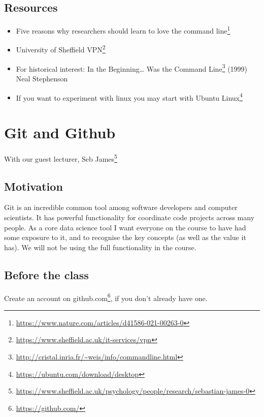 \documentclass[
  12pt,
  a5paper,
]{book}
\DeclareRobustCommand{\href}[2]{#2\footnote{\url{#1}}}
\providecommand{\tightlist}{%
  \setlength{\itemsep}{0pt}\setlength{\parskip}{0pt}}
\begin{document}
\hypertarget{resources-7}{%
\section{Resources}\label{resources-7}}

\begin{itemize}
\tightlist
\item
  \href{https://www.nature.com/articles/d41586-021-00263-0}{Five reasons why researchers should learn to love the command line}
\item
  \href{https://www.sheffield.ac.uk/it-services/vpn}{University of Sheffield VPN}
\item
  For historical interest: \href{http://cristal.inria.fr/~weis/info/commandline.html}{In the Beginning\ldots{} Was the Command Line} (1999) Neal Stephenson
\item
  If you want to experiment with linux you may start with \href{https://ubuntu.com/download/desktop}{Ubuntu Linux}
\end{itemize}

\hypertarget{git-and-github}{%
\chapter{Git and Github}\label{git-and-github}}

With our guest lecturer, \href{https://www.sheffield.ac.uk/psychology/people/research/sebastian-james-0}{Seb James}

\hypertarget{motivation-1}{%
\section{Motivation}\label{motivation-1}}

Git is an incredible common tool among software developers and computer scientists. It has powerful functionality for coordinate code projects across many people. As a core data science tool I want everyone on the course to have had some exposure to it, and to recognise the key concepts (as well as the value it has). We will not be using the full functionality in the course.

\hypertarget{before-the-class}{%
\section{Before the class}\label{before-the-class}}

Create an account on \href{https://github.com/}{github.com}, if you don't already have one.
\end{document}
